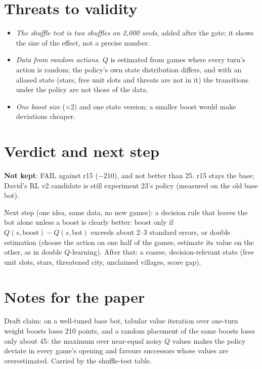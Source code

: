 \documentclass{../polyexp}
\begin{document}
\section{Threats to validity}
\begin{itemize}
  \item \emph{The shuffle test is two shuffles on 2{,}000 seeds}, added after the gate; it shows the size of the
        effect, not a precise number.
  \item \emph{Data from random actions.} $Q$ is estimated from games where every turn's action is random; the
        policy's own state distribution differs, and with an aliased state (stars, free unit slots and threats are
        not in it) the transitions under the policy are not those of the data.
  \item \emph{One boost size} (×2) and one state version; a smaller boost would make deviations cheaper.
\end{itemize}

\section{Verdict and next step}
\textbf{Not kept}: FAIL against r15 ($-210$), and not better than 25. r15 stays the base; David's RL v2 candidate
is still experiment 23's policy (measured on the old base bot).

Next step (one idea, same data, no new games): a decision rule that leaves the bot alone unless a boost is clearly
better: boost only if $Q(s, \text{boost}) - Q(s, \text{bot})$ exceeds about 2--3 standard errors, or double
estimation (choose the action on one half of the games, estimate its value on the other, as in double
$Q$-learning). After that: a coarse, decision-relevant state (free unit slots, stars, threatened city, unclaimed
villages, score gap).

\section{Notes for the paper}
Draft claim: on a well-tuned base bot, tabular value iteration over one-turn weight boosts loses 210 points, and
a random placement of the same boosts loses only about 45: the maximum over near-equal noisy $Q$ values makes the
policy deviate in every game's opening and favours successors whose values are overestimated. Carried by the
shuffle-test table.
\end{document}

